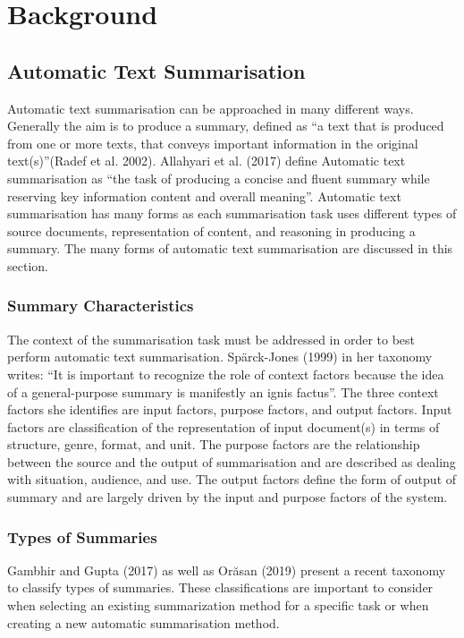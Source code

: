 \chapter{Background}

\section{Automatic Text Summarisation}

Automatic text summarisation can be approached in many different ways. Generally the aim is to produce a summary, defined as “a text that is produced from one or more texts, that conveys important information in the original text(s)”(Radef et al. 2002). Allahyari et al. (2017) define Automatic text summarisation as “the task of producing a concise and fluent summary while reserving key information content and overall meaning”. Automatic text summarisation has many forms as each summarisation task uses different types of source documents, representation of content, and reasoning in producing a summary. The many forms of automatic text summarisation are discussed in this section.

\subsection{Summary Characteristics}

The context of the summarisation task must be addressed in order to best perform automatic text summarisation. Spärck-Jones (1999) in her taxonomy writes: “It is important to recognize the role of context factors because the idea of a general-purpose summary is manifestly an ignis factus”. The three context factors she identifies are input factors, purpose factors, and output factors. Input factors are classification of the representation of input document(s) in terms of structure, genre, format, and unit. The purpose factors are the relationship between the source and the output of summarisation and are described as dealing with situation, audience, and use. The output factors define the form of output of summary and are largely driven by the input and purpose factors of the system.

\subsection{Types of Summaries}

Gambhir and Gupta (2017) as well as Orăsan (2019) present a recent taxonomy to classify types of summaries. These classifications are important to consider when selecting an existing summarization method for a specific task or when creating a new automatic summarisation method. 

